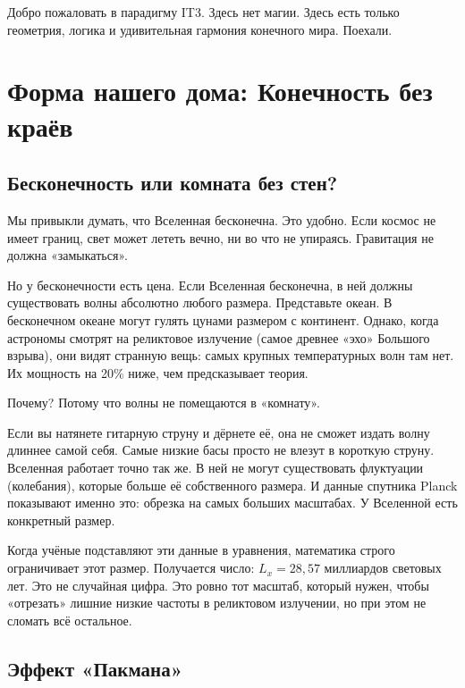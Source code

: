 \documentclass[12pt,a4paper,oneside]{book}
\begin{document}
Добро пожаловать в парадигму IT3. Здесь нет магии. Здесь есть только геометрия, логика и удивительная гармония конечного мира. Поехали.

\mainmatter

\chapter{Форма нашего дома: Конечность без краёв}

\section{Бесконечность или комната без стен?}

Мы привыкли думать, что Вселенная бесконечна. Это удобно. Если космос не имеет границ, свет может лететь вечно, ни во что не упираясь. Гравитация не должна «замыкаться».

Но у бесконечности есть цена. Если Вселенная бесконечна, в ней должны существовать волны абсолютно любого размера. Представьте океан. В бесконечном океане могут гулять цунами размером с континент. Однако, когда астрономы смотрят на реликтовое излучение (самое древнее «эхо» Большого взрыва), они видят странную вещь: самых крупных температурных волн там нет. Их мощность на 20\% ниже, чем предсказывает теория.

Почему? Потому что волны не помещаются в «комнату».

Если вы натянете гитарную струну и дёрнете её, она не сможет издать волну длиннее самой себя. Самые низкие басы просто не влезут в короткую струну. Вселенная работает точно так же. В ней не могут существовать флуктуации (колебания), которые больше её собственного размера. И данные спутника Planck показывают именно это: обрезка на самых больших масштабах. У Вселенной есть конкретный размер.

Когда учёные подставляют эти данные в уравнения, математика строго ограничивает этот размер. Получается число: $L_x = 28{,}57$ миллиардов световых лет. Это не случайная цифра. Это ровно тот масштаб, который нужен, чтобы «отрезать» лишние низкие частоты в реликтовом излучении, но при этом не сломать всё остальное.

\section{Эффект «Пакмана»}
\end{document}
